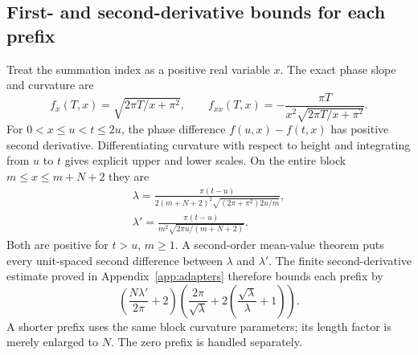 \documentclass[11pt,a4paper]{article}
\numberwithin{equation}{section}
\theoremstyle{definition}
\begin{document}
\subsection{First- and second-derivative bounds for each prefix}
Treat the summation index as a positive real variable $x$. The exact phase
slope and curvature are
\[
 f_x(T,x)=\sqrt{2\pi T/x+\pi^2},\qquad
 f_{xx}(T,x)=-\frac{\pi T}{x^2\sqrt{2\pi T/x+\pi^2}}.
\]
For $0<x\le u<t\le2u$, the phase difference
$f(u,x)-f(t,x)$ has positive second derivative. Differentiating curvature
with respect to height and integrating from $u$ to $t$ gives explicit upper
and lower scales. On the entire block $m\le x\le m+N+2$ they are
\begin{gather*}
 \lambda=\frac{\pi(t-u)}{2(m+N+2)^2
        \sqrt{(2\pi+\pi^2)2u/m}},\\
 \lambda'=\frac{\pi(t-u)}{m^2\sqrt{2\pi u/(m+N+2)}}.
\end{gather*}
Both are positive for $t>u$, $m\ge1$. A second-order mean-value theorem
puts every unit-spaced second difference between $\lambda$ and $\lambda'$.
The finite second-derivative estimate proved in
Appendix~\ref{app:adapters} therefore bounds each prefix by
\[
 \left(\frac{N\lambda'}{2\pi}+2\right)
 \left(\frac{2\pi}{\sqrt\lambda}
       +2\left(\frac{\sqrt\lambda}{\lambda}+1\right)\right).
\]
A shorter prefix uses the same block curvature parameters; its length factor
is merely enlarged to $N$. The zero prefix is handled separately.
\end{document}
